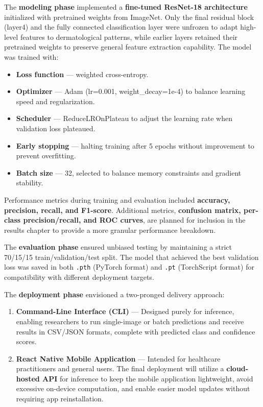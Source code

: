 \documentclass[
  12pt,
  oneside]{article}
\providecommand{\tightlist}{%
  \setlength{\itemsep}{0pt}\setlength{\parskip}{0pt}}
\begin{document}
The \textbf{modeling phase} implemented a \textbf{fine-tuned ResNet-18
architecture} initialized with pretrained weights from ImageNet. Only
the final residual block (layer4) and the fully connected classification
layer were unfrozen to adapt high-level features to dermatological
patterns, while earlier layers retained their pretrained weights to
preserve general feature extraction capability. The model was trained
with:

\begin{itemize}
\tightlist
\item
  \textbf{Loss function} --- weighted cross-entropy.
\item
  \textbf{Optimizer} --- Adam (lr=0.001, weight\_decay=1e-4) to balance
  learning speed and regularization.
\item
  \textbf{Scheduler} --- ReduceLROnPlateau to adjust the learning rate
  when validation loss plateaued.
\item
  \textbf{Early stopping} --- halting training after 5 epochs without
  improvement to prevent overfitting.
\item
  \textbf{Batch size} --- 32, selected to balance memory constraints and
  gradient stability.
\end{itemize}

Performance metrics during training and evaluation included
\textbf{accuracy, precision, recall, and F1-score}. Additional metrics,
\textbf{confusion matrix, per-class precision/recall, and ROC curves},
are planned for inclusion in the results chapter to provide a more
granular performance breakdown.

The \textbf{evaluation phase} ensured unbiased testing by maintaining a
strict 70/15/15 train/validation/test split. The model that achieved the
best validation loss was saved in both \texttt{.pth} (PyTorch format)
and \texttt{.pt} (TorchScript format) for compatibility with different
deployment targets.

The \textbf{deployment phase} envisioned a two-pronged delivery
approach:

\begin{enumerate}
\def\labelenumi{\arabic{enumi}.}
\tightlist
\item
  \textbf{Command-Line Interface (CLI)} --- Designed purely for
  inference, enabling researchers to run single-image or batch
  predictions and receive results in CSV/JSON formats, complete with
  predicted class and confidence scores.
\item
  \textbf{React Native Mobile Application} --- Intended for healthcare
  practitioners and general users. The final deployment will utilize a
  \textbf{cloud-hosted API} for inference to keep the mobile application
  lightweight, avoid excessive on-device computation, and enable easier
  model updates without requiring app reinstallation.
\end{enumerate}
\end{document}

